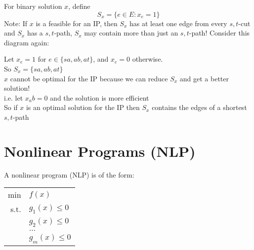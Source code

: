 \documentclass[letterpaper, 12pt]{article}
\newcommand{\red}[1]{{\color{red}{#1}}}
\begin{document}
    For binary solution $x$, define\\
    $$S_x = \{e \in E : x_e = 1\}$$
    Note: If $x$ is a feasible for an IP, then $S_x$ has at least one edge from every $s,t$-cut and $S_x$ has a $s,t$-path, \red{but} $S_x$ may contain more than just an $s,t$-path!
    \pagebreak
    Consider this diagram again:
    \begin{center}
    \end{center}
    Let $x_e = 1$ for $e \in \{sa, ab, at\}$, and $x_e = 0$ otherwise.\\
    So $S_x = \{sa, ab, at\}$\\
    $x$ cannot be optimal for the IP because we can reduce $S_x$ and get a better solution!\\
    i.e. let $x_ab = 0$ and the solution is more efficient\\
    \bigskip
    So if $x$ is an optimal solution for the IP \red{and $c_e \geq 0$ for all $e \in E$} then $S_x$ contains the edges of a shortest $s,t$-path

    \pagebreak
    \section{Nonlinear Programs (NLP)}
    A nonlinear program (NLP) is of the form:\\
    \begin{center}
            \begin{tabular}{rl}
                min & $f(x)$\\
                s.t. & $g_1(x) \leq 0$\\
                & $g_2(x) \leq 0$\\
                & $\dots$\\
                & $g_m(x) \leq 0$\\
            \end{tabular}
    \end{center}
\end{document}
